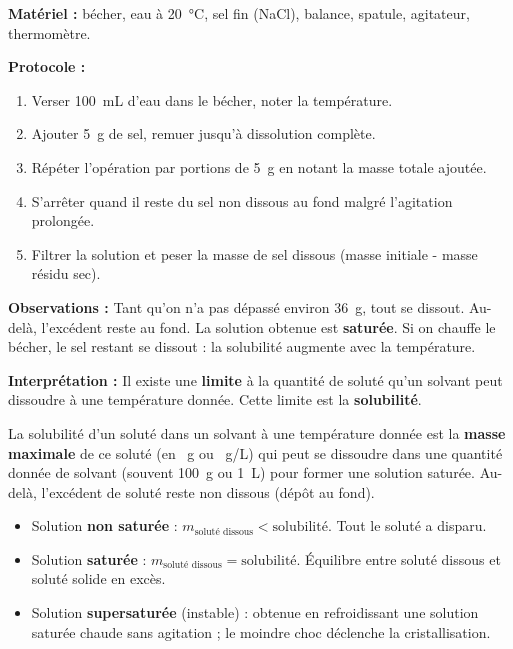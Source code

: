 \documentclass[11pt]{article}
\newcommand{\cle}[1]{{\popxbold\color{popdark}#1}}
\begin{document}
\begin{experience}
\textbf{Matériel :} bécher, eau à \SI{20}{\celsius}, sel fin (NaCl), balance, spatule, agitateur, thermomètre.

\textbf{Protocole :}
\begin{enumerate}
\item Verser \SI{100}{mL} d'eau dans le bécher, noter la température.
\item Ajouter \SI{5}{g} de sel, remuer jusqu'à dissolution complète.
\item Répéter l'opération par portions de \SI{5}{g} en notant la masse totale ajoutée.
\item S'arrêter quand il reste du sel non dissous au fond malgré l'agitation prolongée.
\item Filtrer la solution et peser la masse de sel dissous (masse initiale - masse résidu sec).
\end{enumerate}

\textbf{Observations :} Tant qu'on n'a pas dépassé environ \SI{36}{g}, tout se dissout. Au-delà, l'excédent reste au fond. La solution obtenue est \textbf{saturée}. Si on chauffe le bécher, le sel restant se dissout : la solubilité augmente avec la température.

\textbf{Interprétation :} Il existe une \textbf{limite} à la quantité de soluté qu'un solvant peut dissoudre à une température donnée. Cette limite est la \textbf{solubilité}.
\end{experience}

\begin{definition}
La \cle{solubilité} d'un soluté dans un solvant à une température donnée est la \textbf{masse maximale} de ce soluté (en \SI{}{g} ou \SI{}{g/L}) qui peut se dissoudre dans une quantité donnée de solvant (souvent \SI{100}{g} ou \SI{1}{L}) pour former une \cle{solution saturée}. Au-delà, l'excédent de soluté reste non dissous (dépôt au fond).
\begin{itemize}
\item Solution \textbf{non saturée} : $m_{\text{soluté dissous}} < \text{solubilité}$. Tout le soluté a disparu.
\item Solution \textbf{saturée} : $m_{\text{soluté dissous}} = \text{solubilité}$. Équilibre entre soluté dissous et soluté solide en excès.
\item Solution \textbf{supersaturée} (instable) : obtenue en refroidissant une solution saturée chaude sans agitation ; le moindre choc déclenche la cristallisation.
\end{itemize}
\end{definition}
\end{document}

